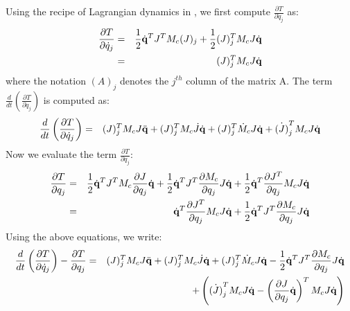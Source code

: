 Using the recipe of Lagrangian dynamics in , we first compute $\frac{\partial T}{\partial \dot{q}_j}$ as:
\begin{eqnarray}
\nonumber
\frac{\partial T}{\partial \dot{q}_j} & = & \frac{1}{2}\dot{\mathbf{q}}^T J^T M_c (J)_j + \frac{1}{2} (J)_j^T M_c J \dot{\mathbf{q}}\\
 & = & (J)_j^T M_c J \dot{\mathbf{q}}
\end{eqnarray}
where the notation $(A)_j$ denotes the $j^{th}$ column of the matrix A. The term $\frac{d}{dt} \left( \frac{\partial T}{\partial \dot{q}_j} \right )$ is computed as:
\begin{eqnarray}
\label{eq:lagterm1}
\frac{d}{dt} \left ( \frac{\partial T}{\partial \dot{q}_j} \right ) & = & (J)_j^T M_c J \ddot{\mathbf{q}} + (J)_j^T M_c \dot{J} \dot{\mathbf{q}} + (J)_j^T \dot{M}_c J \dot{\mathbf{q}} + \dot{(J)}_j^T M_c J \dot{\mathbf{q}}
\end{eqnarray}
Now we evaluate the term $\frac{\partial T}{\partial q_j}$:
\begin{eqnarray}
\nonumber
\frac{\partial T}{\partial q_j} & = & \frac{1}{2}\dot{\mathbf{q}}^T J^T M_c \frac{\partial J}{\partial q_j} \dot{\mathbf{q}} + \frac{1}{2}\dot{\mathbf{q}}^T J^T \frac{\partial M_c}{\partial q_j} J \dot{\mathbf{q}} + \frac{1}{2}\dot{\mathbf{q}}^T \frac{\partial J^T}{\partial q_j} M_c J \dot{\mathbf{q}}\\
\label{eq:lagterm2}
& = & \dot{\mathbf{q}}^T \frac{\partial J^T}{\partial q_j} M_c J \dot{\mathbf{q}} + \frac{1}{2}\dot{\mathbf{q}}^T J^T \frac{\partial M_c}{\partial q_j} J \dot{\mathbf{q}}
\end{eqnarray}
Using the above equations, we write:
\begin{eqnarray}
\label{eq:lageqn_j}
\nonumber
\frac{d}{dt} \left ( \frac{\partial T}{\partial \dot{q}_j} \right ) - \frac{\partial T}{\partial q_j} & = & (J)_j^T M_c J \ddot{\mathbf{q}} + (J)_j^T M_c \dot{J} \dot{\mathbf{q}} + (J)_j^T \dot{M}_c J \dot{\mathbf{q}} - \frac{1}{2}\dot{\mathbf{q}}^T J^T \frac{\partial M_c}{\partial q_j} J \dot{\mathbf{q}} \\ & & + \left ( \dot{(J)}_j^T M_c J \dot{\mathbf{q}}  - \left( \frac{\partial J}{\partial q_j} \dot{\mathbf{q}}\right)^T M_c J \dot{\mathbf{q}} \right )
\end{eqnarray}

